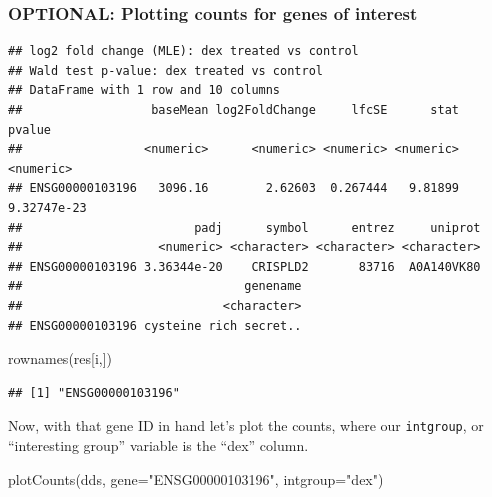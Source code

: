 \documentclass[
]{article}
\newenvironment{Shaded}{\begin{snugshade}}{\end{snugshade}}
\newcommand{\AttributeTok}[1]{\textcolor[rgb]{0.77,0.63,0.00}{#1}}
\newcommand{\FunctionTok}[1]{\textcolor[rgb]{0.00,0.00,0.00}{#1}}
\newcommand{\NormalTok}[1]{#1}
\newcommand{\OtherTok}[1]{\textcolor[rgb]{0.56,0.35,0.01}{#1}}
\newcommand{\SpecialCharTok}[1]{\textcolor[rgb]{0.00,0.00,0.00}{#1}}
\newcommand{\StringTok}[1]{\textcolor[rgb]{0.31,0.60,0.02}{#1}}
\begin{document}
\hypertarget{optional-plotting-counts-for-genes-of-interest}{%
\subsubsection{OPTIONAL: Plotting counts for genes of
interest}\label{optional-plotting-counts-for-genes-of-interest}}

\begin{Shaded}
\end{Shaded}

\begin{verbatim}
## log2 fold change (MLE): dex treated vs control 
## Wald test p-value: dex treated vs control 
## DataFrame with 1 row and 10 columns
##                  baseMean log2FoldChange     lfcSE      stat      pvalue
##                 <numeric>      <numeric> <numeric> <numeric>   <numeric>
## ENSG00000103196   3096.16        2.62603  0.267444   9.81899 9.32747e-23
##                        padj      symbol      entrez     uniprot
##                   <numeric> <character> <character> <character>
## ENSG00000103196 3.36344e-20    CRISPLD2       83716  A0A140VK80
##                               genename
##                            <character>
## ENSG00000103196 cysteine rich secret..
\end{verbatim}

\begin{Shaded}
\begin{Highlighting}[]
\FunctionTok{rownames}\NormalTok{(res[i,])}
\end{Highlighting}
\end{Shaded}

\begin{verbatim}
## [1] "ENSG00000103196"
\end{verbatim}

Now, with that gene ID in hand let's plot the counts, where our
\texttt{intgroup}, or ``interesting group'' variable is the ``dex''
column.

\begin{Shaded}
\begin{Highlighting}[]
\FunctionTok{plotCounts}\NormalTok{(dds, }\AttributeTok{gene=}\StringTok{"ENSG00000103196"}\NormalTok{, }\AttributeTok{intgroup=}\StringTok{"dex"}\NormalTok{)}
\end{Highlighting}
\end{Shaded}
\end{document}
